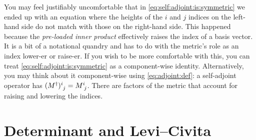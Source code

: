 \documentclass[12pt, oneside]{report}    %
\let\oldsection\section
\def\section{%
  \setcounter{sidenote}{1}%
  \oldsection
}
\begin{document}
You may feel justifiably uncomfortable that in \eqref{eq:self:adjoint:is:symmetric} we ended up with an equation where the heights of the $i$ and $j$ indices on the left-hand side do not match with those on the right-hand side. This happened because the \emph{pre-loaded inner product} effectively raises the index of a basis vector. It is a bit of a notational quandry and has to do with the metric's role as an index lower-er or raise-er. If you wish to be more comfortable with this, you can treat \eqref{eq:self:adjoint:is:symmetric} as a component-wise identity. Alternatively, you may think about it component-wise using \eqref{eq:adjoint:def}: a self-adjoint operator has $(M^\dag)\aij{i}{j} = M\aij{i}{j}$. There are factors of the metric that account for raising and lowering the indices.

\section{Determinant and Levi--Civita}
\label{sec:determinants}
\end{document}
